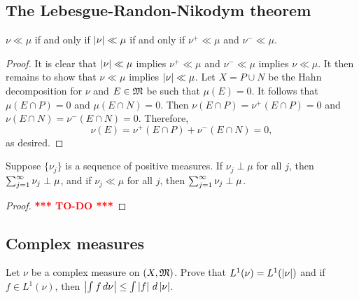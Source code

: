 \documentclass[a4paper]{article}
\newcommand{\TODO}{\textcolor{red}{\textbf{*** TO-DO ***}}}
\begin{document}
\subsection{The Lebesgue-Randon-Nikodym theorem}

\begin{ex}[Folland 3.8]
$\nu \ll \mu$ if and only if $\left\lvert \nu\right\rvert \ll \mu$ 
if and only if $\nu^+ \ll \mu$ and $\nu^- \ll \mu$.
\end{ex}

\begin{proof}
It is clear that $\left\lvert \nu\right\rvert \ll \mu$ implies 
$\nu^+ \ll \mu$ and $\nu^- \ll \mu$ implies 
$\nu \ll \mu$. It then remains to show that $\nu \ll \mu$ 
implies $\left\lvert \nu\right\rvert \ll \mu$. Let $X = P \cup N$ be the Hahn 
decomposition for $\nu$ and $E \in \mathfrak{M}$ be such that 
$\mu(E) = 0$. It follows that 
$\mu(E \cap P) = 0$ and $\mu (E \cap N) = 0$. Then 
$\nu(E \cap P) = \nu^+ (E \cap P) = 0$ and 
$\nu(E \cap N) = \nu^- (E \cap N) = 0$. Therefore, 
\[
\nu (E) = \nu^+ (E \cap P) + \nu^- (E \cap N) = 0,
\]
as desired.
\end{proof}

\begin{ex}[Folland 3.9]
Suppose $\{\nu_j\}$ is a sequence of positive measures.
If $\nu_j \perp \mu$ for all $j$, then $\sum_{j=1}^\infty \nu_j \perp \mu$, 
and if $\nu_j \ll \mu$ for all $j$, then $\sum_{j=1}^\infty \nu_j 
\perp \mu$.
\end{ex}

\begin{proof}
\TODO
\end{proof}

\subsection{Complex measures}

\begin{ex}[Folland 3.18]
Let $\nu$ be a complex measure on $(X, \mathfrak{M})$. Prove that 
$L^1 (\nu) = L^1 (\left\lvert \nu\right\rvert)$ and if $f \in L^1 (\nu)$, then 
$\left\lvert \int f \, d \nu\right\rvert \leq \int \left\lvert f\right\rvert \, d \left\lvert \nu\right\rvert$.
\end{ex}
\end{document}

